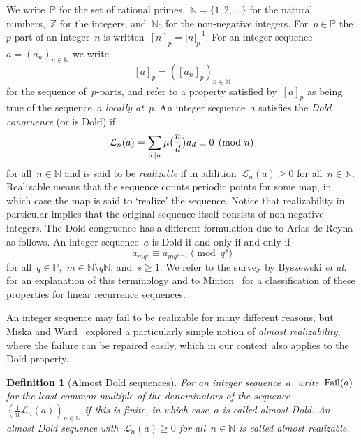 \documentclass[]{interact}
\theoremstyle{plain}
\numberwithin{equation}{section} %
\newtheorem{definition}[thm]{Definition}
\numberwithin{table}{section} %
\numberwithin{figure}{section}
\def\NN{\mathbb{N}}
\def\PP{\mathbb{P}}
\def\ZZ{\mathbb{Z}}
\newcommand\failure{{\rm{Fail}}}
\newcommand\least{{\mathcal{L}}}
\newcommand\smalldivides{\mathrel{\kern-2pt\kern3.5pt|}}
\def\ge{\geqslant}
\begin{document}
We write~$\PP$ for the set of rational primes,~$\NN=\{1,2,\dots\}$
for the natural numbers,~$\ZZ$ for the integers,
and~$\NN_0$ for the non-negative integers.
For~$p\in\PP$ the~$p$-part of an integer~$n$
is written~$[n]_p=|n|_p^{-1}$. For an integer sequence~$a=(a_n)_{n\in\NN}$
we write
\[
[a]_p=([a_n]_p)_{n\in\NN}
\]
for the
sequence of~$p$-parts, and refer to a property satisfied by~$[a]_p$
as being true of the sequence~$a$ \emph{locally at~$p$}.
An integer sequence~$a$ satisfies the \emph{Dold congruence}
(or is Dold) if
\begin{equation*}\label{equationDoldForIntegerSequence}
\least_n(a)
=
\sum_{d\smalldivides n}\mu\bigl(\frac{n}{d}\bigr)a_d
\equiv
0\pmod{n}
\end{equation*}
for all~$n\in\NN$
and is said to be \emph{realizable} if
in addition~$\least_n(a)\ge0$ for all~$n\in\NN$.
Realizable means that the
sequence counts periodic points for some map,
in which case
the map is said to `realize' the sequence.
Notice that realizability in particular implies that the
original
sequence itself consists of non-negative integers.
The Dold congruence has a different formulation
due to Arias de Reyna~\cite{zbMATH02203410} as follows.
An integer sequence~$a$ is Dold if and only
if and only if
\begin{equation}\label{equationDoldForIntegerSequence2}
a_{mq^s}
\equiv
a_{mq^{s-1}}
\pmod{q^s}
\end{equation}
for all~$q\in\PP$,~$m\in\NN\setminus q\mathbb{N}$, and~$s\ge1$.
We refer to the survey by Byszewski {\it{et al.}}~\cite{MR4332826}
for an explanation of this terminology
and to Minton~\cite{MR3195758} for a classification of
these properties for linear recurrence sequences.

An integer sequence may fail to be realizable for
many different reasons, but Miska and Ward~\cite{MR4361581}
explored
a particularly simple notion of \emph{almost realizability},
where the failure can be repaired easily,
which in our context also applies to the Dold property.

\begin{definition}[Almost Dold sequences]\label{definitionAlmostDold}
For an integer sequence~$a$,
write~$\failure(a)$
for the least common multiple of
the denominators of the sequence~$(\frac{1}{n}\least_n(a))_{n\in\NN}$
if this is finite, in which case~$a$
is called \emph{almost Dold}.
An almost Dold sequence with~$\least_n(a)\ge0$
for all~$n\in\NN$ is called \emph{almost realizable}.
\end{definition}
\end{document}
